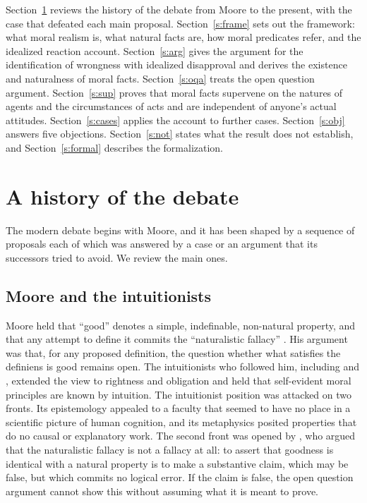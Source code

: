 \documentclass{situationist-preprint}
\begin{document}
Section~\ref{s:hist} reviews the history of the debate from Moore to the present, with the case that defeated each main proposal. Section~\ref{s:frame} sets out the framework: what moral realism is, what natural facts are, how moral predicates refer, and the idealized reaction account. Section~\ref{s:arg} gives the argument for the identification of wrongness with idealized disapproval and derives the existence and naturalness of moral facts. Section~\ref{s:oqa} treats the open question argument. Section~\ref{s:sup} proves that moral facts supervene on the natures of agents and the circumstances of acts and are independent of anyone's actual attitudes. Section~\ref{s:cases} applies the account to further cases. Section~\ref{s:obj} answers five objections. Section~\ref{s:not} states what the result does not establish, and Section~\ref{s:formal} describes the formalization.

\section{A history of the debate}\label{s:hist}

The modern debate begins with Moore, and it has been shaped by a sequence of proposals each of which was answered by a case or an argument that its successors tried to avoid. We review the main ones.

\subsection{Moore and the intuitionists}

Moore held that \enquote{good} denotes a simple, indefinable, non-natural property, and that any attempt to define it commits the \enquote{naturalistic fallacy} \citep[\S\S 10--14]{Moore1903}. His argument was that, for any proposed definition, the question whether what satisfies the definiens is good remains open. The intuitionists who followed him, including \citet{Prichard1912} and \citet{Ross1930}, extended the view to rightness and obligation and held that self-evident moral principles are known by intuition. The intuitionist position was attacked on two fronts. Its epistemology appealed to a faculty that seemed to have no place in a scientific picture of human cognition, and its metaphysics posited properties that do no causal or explanatory work. The second front was opened by \citet{Frankena1939}, who argued that the naturalistic fallacy is not a fallacy at all: to assert that goodness is identical with a natural property is to make a substantive claim, which may be false, but which commits no logical error. If the claim is false, the open question argument cannot show this without assuming what it is meant to prove.
\end{document}
